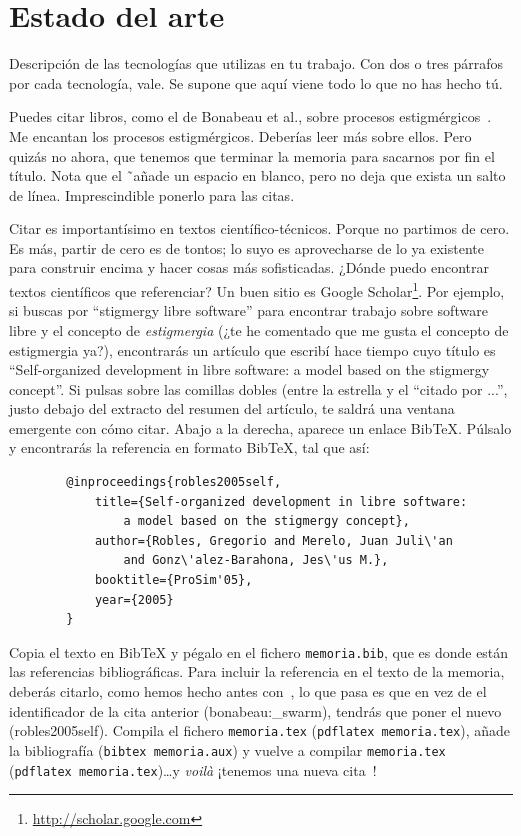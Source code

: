 \chapter{Estado del arte}               %
\label{chap:tecnologias}

Descripción de las tecnologías que utilizas en tu trabajo. 
Con dos o tres párrafos por cada tecnología, vale. 
Se supone que aquí viene todo lo que no has hecho tú.

Puedes citar libros, como el de Bonabeau et al., sobre procesos estigmérgicos~\cite{bonabeau:_swarm}. 
Me encantan los procesos estigmérgicos.
Deberías leer más sobre ellos.
Pero quizás no ahora, que tenemos que terminar la memoria para sacarnos por fin el título.
Nota que el \~ \ añade un espacio en blanco, pero no deja que exista un salto de línea. 
Imprescindible ponerlo para las citas.

Citar es importantísimo en textos científico-técnicos. 
Porque no partimos de cero.
Es más, partir de cero es de tontos; lo suyo es aprovecharse de lo ya existente para construir encima y hacer cosas más sofisticadas.
¿Dónde puedo encontrar textos científicos que referenciar?
Un buen sitio es Google Scholar\footnote{\url{http://scholar.google.com}}.
Por ejemplo, si buscas por ``stigmergy libre software'' para encontrar trabajo sobre software libre y el concepto de \emph{estigmergia} (¿te he comentado que me gusta el concepto de estigmergia ya?), encontrarás un artículo que escribí hace tiempo cuyo título es ``Self-organized development in libre software: a model based on the stigmergy concept''.
Si pulsas sobre las comillas dobles (entre la estrella y el ``citado por ...'', justo debajo del extracto del resumen del artículo, te saldrá una ventana emergente con cómo citar.
Abajo a la derecha, aparece un enlace BibTeX.
Púlsalo y encontrarás la referencia en formato BibTeX, tal que así:

\clearpage
{\footnotesize
    \begin{verbatim}
        @inproceedings{robles2005self,
            title={Self-organized development in libre software:
                a model based on the stigmergy concept},
            author={Robles, Gregorio and Merelo, Juan Juli\'an 
                and Gonz\'alez-Barahona, Jes\'us M.},
            booktitle={ProSim'05},
            year={2005}
        }
    \end{verbatim}
}

Copia el texto en BibTeX y pégalo en el fichero \texttt{memoria.bib}, que es donde están las referencias bibliográficas.
Para incluir la referencia en el texto de la memoria, deberás citarlo, como hemos hecho antes con~\cite{bonabeau:_swarm}, lo que pasa es que en vez de el identificador de la cita anterior (bonabeau:\_swarm), tendrás que poner el nuevo (robles2005self).
Compila el fichero \texttt{memoria.tex} (\texttt{pdflatex memoria.tex}), añade la bibliografía (\texttt{bibtex memoria.aux}) y vuelve a compilar \texttt{memoria.tex} (\texttt{pdflatex memoria.tex})\ldots y \emph{voilà} ¡tenemos una nueva cita~\cite{robles2005self}!

